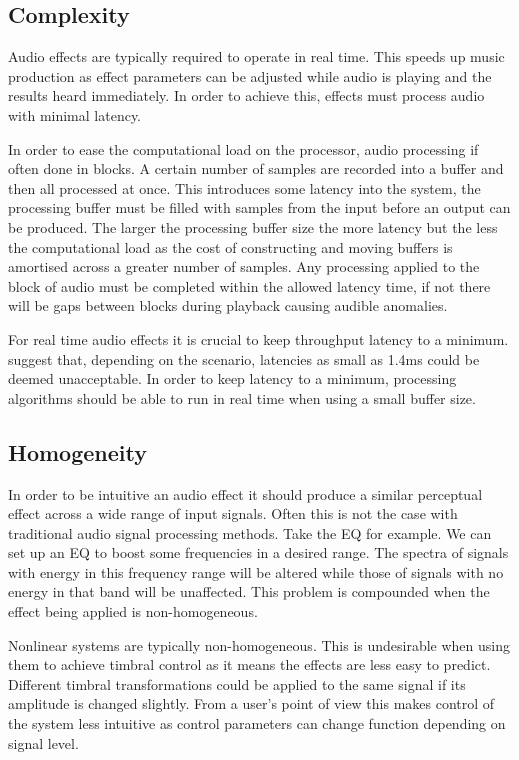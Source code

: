 	\subsection{Complexity}
	\label{sec:ExcitationEvaluation-Evaluation-Complexity}
		Audio effects are typically required to operate in real time. This speeds up music production as effect
		parameters can be adjusted while audio is playing and the results heard immediately. In order to achieve
		this, effects must process audio with minimal latency. 

		In order to ease the computational load on the processor, audio processing if often done in blocks. A
		certain number of samples are recorded into a buffer and then all processed at once. This introduces some
		latency into the system, the processing buffer must be filled with samples from the input before an output
		can be produced. The larger the processing buffer size the more latency but the less the computational load
		as the cost of constructing and moving buffers is amortised across a greater number of samples. Any
		processing applied to the block of audio must be completed within the allowed latency time, if not there
		will be gaps between blocks during playback causing audible anomalies.

		For real time audio effects it is crucial to keep throughput latency to a minimum. \citet{lester2007the}
		suggest that, depending on the scenario, latencies as small as 1.4ms could be deemed unacceptable. In order
		to keep latency to a minimum, processing algorithms should be able to run in real time when using a small
		buffer size.

	\subsection{Homogeneity}
	\label{sec:ExcitationEvaluation-Evaluation-Homogeneity}
		In order to be intuitive an audio effect it should produce a similar perceptual effect across a wide range
		of input signals. Often this is not the case with traditional audio signal processing methods. Take the EQ
		for example. We can set up an EQ to boost some frequencies in a desired range. The spectra of signals with
		energy in this frequency range will be altered while those of signals with no energy in that band will be
		unaffected. This problem is compounded when the effect being applied is non-homogeneous.
		
		Nonlinear systems are typically non-homogeneous. This is undesirable when using them to achieve timbral
		control as it means the effects are less easy to predict. Different timbral transformations could be
		applied to the same signal if its amplitude is changed slightly. From a user's point of view this makes
		control of the system less intuitive as control parameters can change function depending on signal level.

